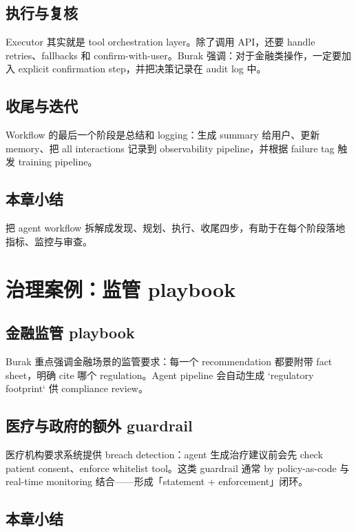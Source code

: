 \documentclass[a4paper]{article}
\begin{document}
\subsection{执行与复核}

Executor 其实就是 tool orchestration layer。除了调用 API，还要 handle retries、fallbacks 和 confirm-with-user。Burak 强调：对于金融类操作，一定要加入 explicit confirmation step，并把决策记录在 audit log 中。

\subsection{收尾与迭代}

Workflow 的最后一个阶段是总结和 logging：生成 summary 给用户、更新 memory、把 all interactions 记录到 observability pipeline，并根据 failure tag 触发 training pipeline。

\subsection{本章小结}

把 agent workflow 拆解成发现、规划、执行、收尾四步，有助于在每个阶段落地指标、监控与审查。

\section{治理案例：监管 playbook}

\subsection{金融监管 playbook}

Burak 重点强调金融场景的监管要求：每一个 recommendation 都要附带 fact sheet，明确 cite 哪个 regulation。Agent pipeline 会自动生成 `regulatory footprint` 供 compliance review。

\subsection{医疗与政府的额外 guardrail}

医疗机构要求系统提供 breach detection：agent 生成治疗建议前会先 check patient consent、enforce whitelist tool。这类 guardrail 通常 by policy-as-code 与 real-time monitoring 结合——形成「statement + enforcement」闭环。

\subsection{本章小结}
\end{document}
